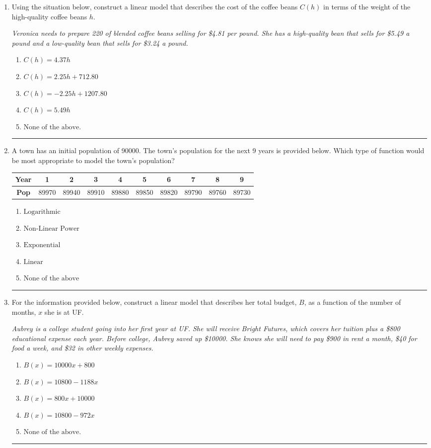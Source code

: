 \documentclass[14pt]{extbook}
\newcommand{\litem}[1]{\item#1\hspace*{-1cm}\rule{\textwidth}{0.4pt}}
\begin{document}
\begin{enumerate}
{\begin{enumerate}[label=\Alph*.]
\end{enumerate} }
\litem{
Using the situation below, construct a linear model that describes the cost of the coffee beans $C(h)$ in terms of the weight of the high-quality coffee beans $h$.
\begin{center}
    \textit{ Veronica needs to prepare 220 of blended coffee beans selling for \$4.81 per pound. She has a high-quality bean that sells for \$5.49 a pound and a low-quality bean that sells for \$3.24 a pound. }
\end{center}
\begin{enumerate}[label=\Alph*.]
\item \( C(h) = 4.37 h \)
\item \( C(h) = 2.25 h + 712.80 \)
\item \( C(h) = -2.25 h + 1207.80 \)
\item \( C(h) = 5.49 h \)
\item \( \text{None of the above.} \)

\end{enumerate} }
\litem{
A town has an initial population of 90000. The town's population for the next 9 years is provided below. Which type of function would be most appropriate to model the town's population?

\begin{tabular}{c|c|c|c|c|c|c|c|c|c}
\textbf{Year} &1 &2 &3 &4 &5 &6 &7 &8 &9\tabularnewline \hline
\textbf{Pop} &89970 &89940 &89910 &89880 &89850 &89820 &89790 &89760 &89730\end{tabular}\begin{enumerate}[label=\Alph*.]
\item \( \text{Logarithmic} \)
\item \( \text{Non-Linear Power} \)
\item \( \text{Exponential} \)
\item \( \text{Linear} \)
\item \( \text{None of the above} \)

\end{enumerate} }
\litem{
For the information provided below, construct a linear model that describes her total budget, $B$, as a function of the number of months, $x$ she is at UF.
\begin{center}
    \textit{ Aubrey is a college student going into her first year at UF. She will receive Bright Futures, which covers her tuition plus a \$800 educational expense each year. Before college, Aubrey saved up \$10000. She knows she will need to pay \$900 in rent a month, \$40 for food a week, and \$32 in other weekly expenses. }
\end{center}
\begin{enumerate}[label=\Alph*.]
\item \( B(x) = 10000 x + 800 \)
\item \( B(x) = 10800 - 1188 x \)
\item \( B(x) = 800 x + 10000 \)
\item \( B(x) = 10800 - 972 x \)
\item \( \text{None of the above.} \)


\end{enumerate}}
\end{enumerate}
\end{document}
